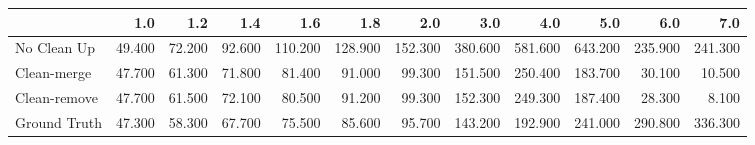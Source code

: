 \begin{tabular}{lrrrrrrrrrrr}
\toprule
{} &    1.0 &    1.2 &    1.4 &     1.6 &     1.8 &     2.0 &     3.0 &     4.0 &     5.0 &     6.0 &     7.0 \\
\midrule
No Clean Up  & 49.400 & 72.200 & 92.600 & 110.200 & 128.900 & 152.300 & 380.600 & 581.600 & 643.200 & 235.900 & 241.300 \\
Clean-merge  & 47.700 & 61.300 & 71.800 &  81.400 &  91.000 &  99.300 & 151.500 & 250.400 & 183.700 &  30.100 &  10.500 \\
Clean-remove & 47.700 & 61.500 & 72.100 &  80.500 &  91.200 &  99.300 & 152.300 & 249.300 & 187.400 &  28.300 &   8.100 \\
Ground Truth & 47.300 & 58.300 & 67.700 &  75.500 &  85.600 &  95.700 & 143.200 & 192.900 & 241.000 & 290.800 & 336.300 \\
\bottomrule
\end{tabular}
